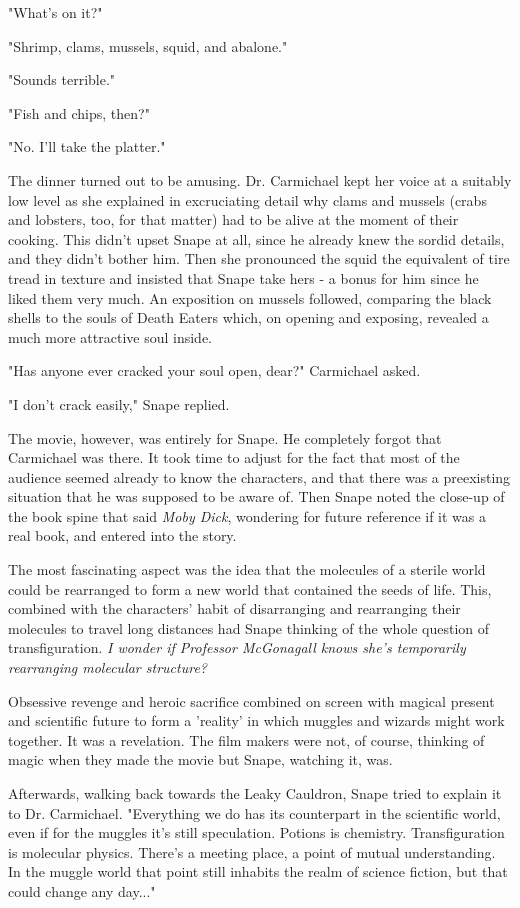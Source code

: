 \documentclass[a4paper,11pt]{article}
\begin{document}
"What's on it?"

"Shrimp, clams, mussels, squid, and abalone."

"Sounds terrible."

"Fish and chips, then?"

"No. I'll take the platter."

The dinner turned out to be amusing. Dr. Carmichael kept her voice at a suitably low level as she explained in excruciating detail why clams and mussels (crabs and lobsters, too, for that matter) had to be alive at the moment of their cooking. This didn't upset Snape at all, since he already knew the sordid details, and they didn't bother him. Then she pronounced the squid the equivalent of tire tread in texture and insisted that Snape take hers - a bonus for him since he liked them very much. An exposition on mussels followed, comparing the black shells to the souls of Death Eaters which, on opening and exposing, revealed a much more attractive soul inside.

"Has anyone ever cracked your soul open, dear?" Carmichael asked.

"I don't crack easily," Snape replied.

The movie, however, was entirely for Snape. He completely forgot that Carmichael was there. It took time to adjust for the fact that most of the audience seemed already to know the characters, and that there was a preexisting situation that he was supposed to be aware of. Then Snape noted the close-up of the book spine that said \emph{Moby Dick}, wondering for future reference if it was a real book, and entered into the story.

The most fascinating aspect was the idea that the molecules of a sterile world could be rearranged to form a new world that contained the seeds of life. This, combined with the characters' habit of disarranging and rearranging their molecules to travel long distances had Snape thinking of the whole question of transfiguration. \emph{I wonder if Professor McGonagall knows she's temporarily rearranging molecular structure?}

Obsessive revenge and heroic sacrifice combined on screen with magical present and scientific future to form a 'reality' in which muggles and wizards might work together. It was a revelation. The film makers were not, of course, thinking of magic when they made the movie but Snape, watching it, was.

Afterwards, walking back towards the Leaky Cauldron, Snape tried to explain it to Dr. Carmichael. "Everything we do has its counterpart in the scientific world, even if for the muggles it's still speculation. Potions is chemistry. Transfiguration is molecular physics. There's a meeting place, a point of mutual understanding. In the muggle world that point still inhabits the realm of science fiction, but that could change any day..."
\end{document}
